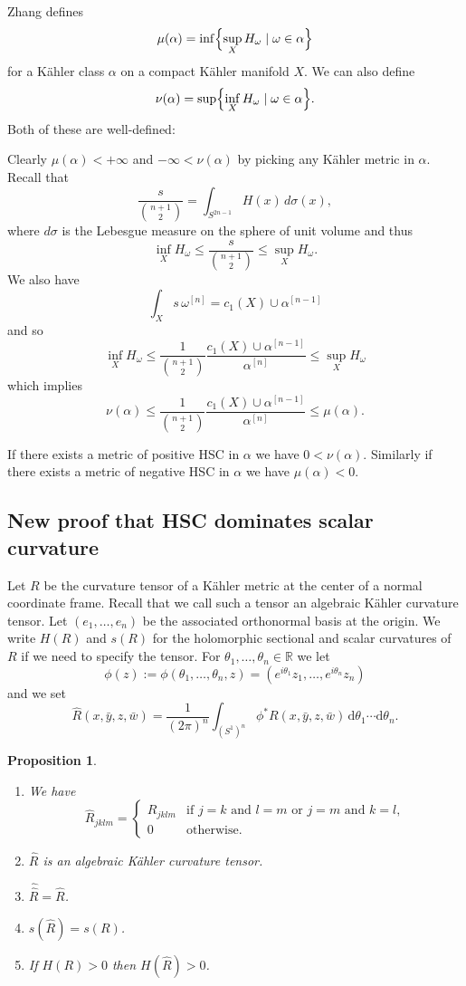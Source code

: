 \documentclass[11pt]{article}
\newtheorem{prop}[theo]{Proposition}
\theoremstyle{definition}
\newcommand{\kk}[1]{\mathbb{#1}}
\def\^#1{^{[#1]}}
\def\d{\mathrm{d}}
\begin{document}
Zhang defines
$$
\mu(\alpha)
= \inf \Bigl\{ \sup_X H_\omega \mid \omega \in \alpha \Bigr\}
$$
for a K\"ahler class $\alpha$ on a compact K\"ahler manifold $X$.
We can also define
$$
\nu(\alpha)
= \sup \Bigl\{ \inf_X H_\omega \mid \omega \in \alpha \Bigr\}.
$$
Both of these are well-defined:

Clearly $\mu(\alpha) < +\infty$ and $-\infty < \nu(\alpha)$ by picking
any K\"ahler metric in $\alpha$.
Recall that
$$
\frac{s}{\binom{n+1}{2}} = \int_{S^{2n-1}} H(x) \, d\sigma(x),
$$
where $d\sigma$ is the Lebesgue measure on the sphere of unit volume
and thus
$$
\inf_X H_\omega
\leq \frac{s}{\binom{n+1}{2}}
\leq \sup_X H_\omega.
$$
We also have
$$
\int_X s \, \omega\^n
= c_1(X) \cup \alpha\^{n-1}
$$
and so
$$
\inf_X H_\omega
\leq \frac{1}{\binom{n+1}{2}} \frac{c_1(X) \cup \alpha\^{n-1}}{\alpha\^n}
\leq \sup_X H_\omega
$$
which implies
$$
\nu(\alpha)
\leq \frac{1}{\binom{n+1}{2}} \frac{c_1(X) \cup \alpha\^{n-1}}{\alpha\^n}
\leq \mu(\alpha).
$$

If there exists a metric of positive HSC in $\alpha$ we have $0 < \nu(\alpha)$.
Similarly if there exists a metric of negative HSC in $\alpha$ we have
$\mu(\alpha) < 0$.


\subsection*{New proof that HSC dominates scalar curvature}

Let $R$ be the curvature tensor of a K\"ahler metric at the center
of a normal coordinate frame.
Recall that we call such a tensor an algebraic K\"ahler curvature tensor.
Let $(e_1,\ldots,e_n)$ be the associated orthonormal basis at the origin.
We write $H(R)$ and $s(R)$ for the holomorphic sectional and scalar
curvatures of $R$ if we need to specify the tensor.
For $\theta_1, \ldots, \theta_n \in \kk R$ we let
$$
\phi(z)
:= \phi(\theta_1, \ldots, \theta_n, z)
= (e^{i\theta_1} z_1, \ldots, e^{i\theta_n} z_n)
$$
and we set
$$
\widehat R(x, \bar y, z, \bar w)
= \frac{1}{(2\pi)^n} \int_{(S^1)^n}
\phi^* R(x, \bar y, z, \bar w) \, \d\theta_1 \cdots \d\theta_n.
$$

\begin{prop}
\begin{enumerate}
\item
We have
$$
\widehat R_{jklm} =
\begin{cases}
R_{jklm} & \text{if $j=k$ and $l=m$ or $j=m$ and $k=l$},
\\
0 & \text{otherwise.}
\end{cases}
$$

\item
$\widehat R$ is an algebraic K\"ahler curvature tensor.

\item
$\widehat{\widehat R} = \widehat R$.

\item
$s(\widehat{R}) = s(R)$.

\item
If $H(R) > 0$ then $H(\widehat R) > 0$.
\end{enumerate}
\end{prop}
\end{document}

